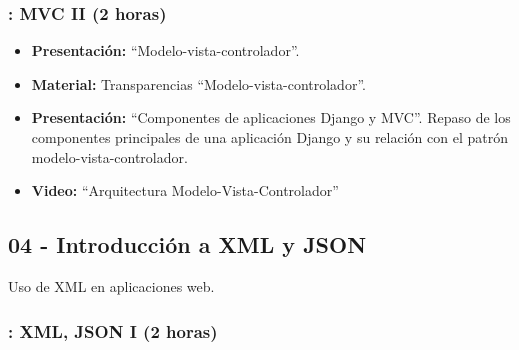 \documentclass[a4paper,12pt]{article}
\begin{document}
\subsubsection{\martesJ: MVC II (2 horas)}
\label{cal:martesJ}

\begin{itemize}
\item \textbf{Presentación:} ``Modelo-vista-controlador''.
\item \textbf{Material:} Transparencias ``Modelo-vista-controlador''.
\item \textbf{Presentación:} ``Componentes de aplicaciones Django y MVC''.
  Repaso de los componentes principales de una aplicación Django y su relación con el patrón modelo-vista-controlador.
\item \textbf{Video:} ``Arquitectura Modelo-Vista-Controlador''
\end{itemize}


\subsection{04 - Introducción a XML y JSON}

Uso de XML en aplicaciones web.

\subsubsection{\martesK: XML, JSON I (2 horas)}
\label{cal:martesK}
\end{document}

